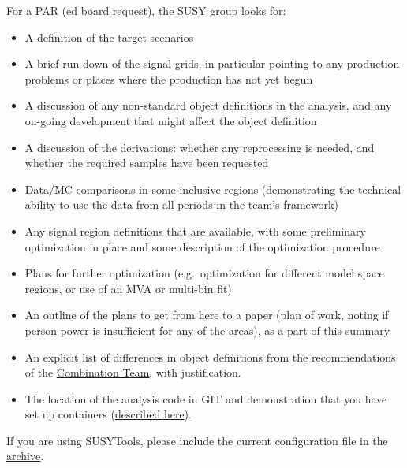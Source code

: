 For a PAR (ed board request), the SUSY group looks for:
\begin{itemize}
\item A definition of the target scenarios
\item A brief run-down of the signal grids, in particular pointing to any production problems or places where the production has not yet begun
\item A discussion of any non-standard object definitions in the analysis, and any on-going development that might affect the object definition
\item A discussion of the derivations: whether any reprocessing is needed, and whether the required samples have been requested
\item Data/MC comparisons in some inclusive regions (demonstrating the technical ability to use the data from all periods in the team's framework)
\item Any signal region definitions that are available, with some preliminary optimization in place and some description of the optimization procedure
\item Plans for further optimization (e.g.\ optimization for different model space regions, or use of an MVA or multi-bin fit)
\item An outline of the plans to get from here to a paper (plan of work, noting if person power is insufficient for any of the areas), as a part of this summary
\item An explicit list of differences in object definitions from the recommendations of the \href{https://gitlab.cern.ch/atlas-phys-susy-wg/Combinations/readme/wikis/home}{Combination Team}, with justification.
\item The location of the analysis code in GIT and demonstration that you have set up containers (\href{https://recast-docs.web.cern.ch/recast-docs/building_images_on_ci/}{described here}).
\end{itemize}

If you are using SUSYTools, please include the current configuration file in the \href{http://gitlab.cern.ch/atlas-phys-susy-wg/AnalysisSUSYToolsConfigurations}{archive}.


